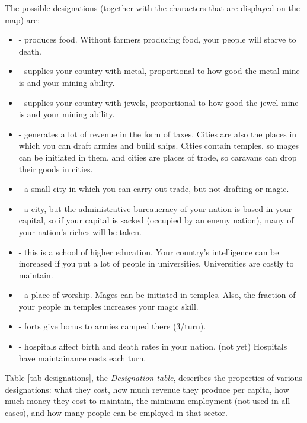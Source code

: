 The possible designations (together with the characters that are
displayed on the map) are:
\begin{itemize}
\item
{} - produces food.  Without farmers producing food,
your people will starve to death.
\item
{} - supplies your country with metal,
proportional to how good the metal mine is and your mining ability.
\item
{} - supplies your country with jewels,
proportional to how good the jewel mine is and your mining ability.
\item
{} - generates a lot of revenue in the form of taxes.
Cities are also the places in which you can draft armies and build
ships.  Cities contain temples, so mages can be initiated in them, and
cities are places of trade, so caravans can drop their goods in
cities.
\item
{} - a small city in which you can carry out trade,
but not drafting or magic.
\item
{} - a city, but the administrative bureaucracy
of your nation is based in your capital, so if your capital is sacked
(occupied by an enemy nation), many of your nation's riches will be
taken.
\item
{} - this is a school of higher education.  Your
country's intelligence can be increased if you put a lot of people in
universities.  Universities are costly to maintain.
\item
{} - a place of worship.  Mages can be initiated in
temples.  Also, the fraction of your people in temples increases your
magic skill.
\item
{} - forts give bonus to armies camped there (3/turn).
\item
{} - hospitals affect birth and death rates in your
nation. (not yet) Hospitals have maintainance costs each turn.
\end{itemize}

Table \ref{tab-designations}, the {\em Designation table}, describes
the properties of various designations: what they cost, how much
revenue they produce per capita, how much money they cost to maintain,
the minimum employment (not used in all cases), and how many people
can be employed in that sector.

